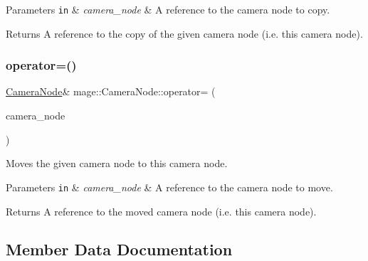 \begin{DoxyParams}[1]{Parameters}
\mbox{\tt in}  & {\em camera\+\_\+node} & A reference to the camera node to copy. \\
\hline
\end{DoxyParams}
\begin{DoxyReturn}{Returns}
A reference to the copy of the given camera node (i.\+e. this camera node). 
\end{DoxyReturn}
\hypertarget{classmage_1_1_camera_node_a8da019549eeac6c4d7d6d7c4017dd498}{}\label{classmage_1_1_camera_node_a8da019549eeac6c4d7d6d7c4017dd498} 
\subsubsection{\texorpdfstring{operator=()}{operator=()}\hspace{0.1cm}{\footnotesize\ttfamily [2/2]}}
{\footnotesize\ttfamily \hyperlink{classmage_1_1_camera_node}{Camera\+Node}\& mage\+::\+Camera\+Node\+::operator= (\begin{DoxyParamCaption}\item[{\hyperlink{classmage_1_1_camera_node}{Camera\+Node} \&\&}]{camera\+\_\+node }\end{DoxyParamCaption})\hspace{0.3cm}{\ttfamily [delete]}}

Moves the given camera node to this camera node.


\begin{DoxyParams}[1]{Parameters}
\mbox{\tt in}  & {\em camera\+\_\+node} & A reference to the camera node to move. \\
\hline
\end{DoxyParams}
\begin{DoxyReturn}{Returns}
A reference to the moved camera node (i.\+e. this camera node). 
\end{DoxyReturn}


\subsection{Member Data Documentation}
\hypertarget{classmage_1_1_camera_node_a18f00f7ccd0c677043e11a1b3085dbfb}{}\label{classmage_1_1_camera_node_a18f00f7ccd0c677043e11a1b3085dbfb} 
